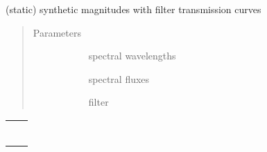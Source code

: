 \documentclass[letterpaper,10pt,english]{sphinxmanual}
\begin{document}
\begin{fulllineitems}
\begin{fulllineitems}
\label{\detokenize{generated/sdapy.snerun.snobject.sym_mag:sdapy.snerun.snobject.sym_mag}}
(static) synthetic magnitudes with filter transmission curves
\begin{quote}\begin{description}
\item[{Parameters}] \leavevmode\begin{description}
\item[{}] \leavevmode{[}\sphinxtitleref{list}{]}
spectral wavelengths

\item[{}] \leavevmode{[}\sphinxtitleref{list}{]}
spectral fluxes

\item[{}] \leavevmode{[}\sphinxtitleref{float}{]}
filter

\end{description}

\end{description}\end{quote}

\end{fulllineitems}



\begin{savenotes}\sphinxattablestart
\centering
\begin{tabulary}{\linewidth}[t]{|T|T|}
\hline

&\\
\hline
{}
&\\
\hline
{}
&\\
\hline
{}
&\\
\hline
{}
&\\
\hline
{}
&\\
\hline
{}
&\\
\hline
\end{tabulary}
\par
\sphinxattableend\end{savenotes}


\end{fulllineitems}
\end{document}
